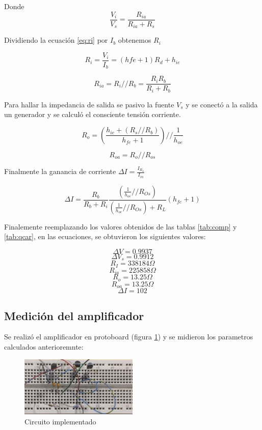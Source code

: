 \documentclass[../../main.tex]{subfiles}
\begin{document}
Donde
\begin{equation}
\frac{V_i}{V_s} = \frac{R_{ia}}{R_{ia}+R_s}
\end{equation}

Dividiendo la ecuación \ref{eq:ri} por $I_b$ obtenemos $R_i$

\begin{equation}
R_i=\frac{V_i}{I_b} = \left( h{fe} +1 \right) R_d + h_{ie}
\end{equation}

\begin{equation}
R_{ia}=R_i // R_b=\frac{R_i R_b}{R_i + R_b}
\end{equation}

Para hallar la impedancia de salida se pasivo la fuente $V_s$ y se conectó a la salida un generador y se calculó el consciente tensión corriente.

\begin{equation}
R_o=\left( \frac{h_{ie} + \left( R_s // R_b \right)}{h_{fe}+1} \right) // \frac{1}{h_{oe}}
\end{equation}

\begin{equation}
R_{oa}=R_o // R_{os}
\end{equation}

Finalmente la ganancia de corriente $\Delta I=\frac{I_{R_L}}{I_{in}}$

\begin{equation}
\Delta I=\frac{R_b}{R_b +R_i} \frac{\left(  \frac{1}{h_{oe}} // R_{Os} \right)}{\left(  \frac{1}{h_{oe}} // R_{Os} \right) + R_L} (h_{fe} +1)
\end{equation}

Finalemente reemplazando los valores obtenidos de las tablas \ref{tab:comp} y \ref{tab:qcar}, en las ecuaciones, se obtuvieron los siguientes valores:

$$\Delta V = 0.9937$$
$$ \Delta V_s =0.9912 $$
$$ R_I=338184 \Omega $$
$$ R_{ia} = 225858\Omega $$
$$ R_o=13.25 \Omega $$
$$R_{oa}=13.25\Omega $$
$$\Delta I= 102 $$

\subsection{Medición del amplificador}
Se realizó el amplificador en protoboard (figura \ref{fig:pro}) y se midieron los parametros calculados anterioremnte:

\begin{figure}[H]	
	\centering
	\includegraphics[width=0.5\textwidth]{imagenes/proto.png}
	\caption{Circuito implementado}\label{fig:pro}
\end{figure}
\end{document}
